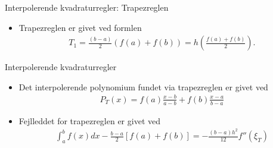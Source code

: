 \begin{frame}{Interpolerende kvadraturregler: Trapezreglen}
\begin{itemize}
    \item %
    Trapezreglen er givet ved formlen 
    \begin{align*}
    T_1 = \frac{(b-a)}{2}(f(a)+f(b))=h (\frac{f(a)+f(b)}{2}).
    \end{align*}
    \end{itemize}
           
\end{frame}


\begin{frame}{Interpolerende kvadraturregler}
\begin{itemize}
    \item Det interpolerende polynomium fundet via trapezreglen er givet ved
    \begin{align*}
    P_{T}(x)=f(a)\frac{x-b}{a-b}+f(b)\frac{x-a}{b-a}       
    \end{align*}
    \item Fejlleddet for trapezreglen er givet ved 
    \begin{align*}
    \int_{a}^{b}f(x)dx-\frac{b-a}{2}\left [ f(a)+f(b) \right ]=-\frac{(b-a)h^2}{12}{f}''(\xi_T)
    \end{align*}
\end{itemize}
\end{frame}


